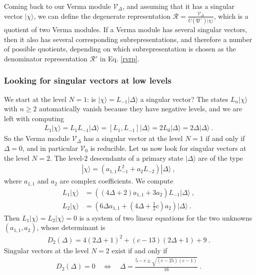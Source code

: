 \documentclass[12pt, a4paper, notitlepage, twoside]{report}
\numberwithin{equation}{section}
\theoremstyle{break}
\begin{document}
Coming back to our Verma module $\mathcal{V}_\Delta$, and assuming that it has a singular vector $|\chi\rangle$, we can define the degenerate representation $\mathcal{R} = \frac{\mathcal{V}_\Delta}{U(\mathfrak{V}^+)|\chi\rangle}$, which is a quotient of two Verma modules.
If a Verma module has several singular vectors, then it also has several corresponding subrepresentations, and therefore a number of possible quotients, depending on which subrepresentation is chosen as the denominator representation $\mathcal{R}'$ in Eq. \eqref{rvrp}.

\subsubsection{Looking for singular vectors at low levels}

We start at the level $N=1$: is $|\chi\rangle=L_{-1}|\Delta\rangle$ a singular vector? The states $L_n|\chi\rangle$ with $n\geq 2$ automatically vanish because they have negative levels, and we are left with computing
\begin{align}
 L_1|\chi\rangle = L_1 L_{-1}|\Delta\rangle = [L_1,L_{-1}]|\Delta\rangle = 2L_0 |\Delta\rangle = 2\Delta|\Delta\rangle\ .
\end{align}
So the Verma module $\mathcal{V}_\Delta$ has a singular vector at the level $N=1$ if and only if $\Delta = 0$, and in particular $\mathcal{V}_0$ is reducible.
Let us now look for singular vectors at the level $N=2$.
The level-$2$ descendants of a primary state $|\Delta\rangle$ are of the type
\begin{align}
 |\chi\rangle = \left(a_{1,1} L_{-1}^2 + a_2 L_{-2}\right) |\Delta\rangle\ ,
\end{align}
where $a_{1,1}$ and $a_2$ are complex coefficients.
We compute 
\begin{align}
 L_1|\chi\rangle &= \left((4\Delta+2)a_{1,1} + 3a_2\right) L_{-1}|\Delta\rangle\ ,
\\
L_2 |\chi \rangle &= \left(6\Delta a_{1,1}+(4\Delta+\tfrac12 c) a_2\right)|\Delta\rangle\ .
\end{align}
Then $L_1|\chi\rangle=L_2 |\chi \rangle=0$ is a system of two linear equations for the two unknowns $(a_{1,1},a_2)$, whose determinant is 
\begin{align}
 D_2(\Delta) = 4(2\Delta+1)^2 +(c-13)(2\Delta+1) +9\ . 
\label{dud}
\end{align}
Singular vectors at the level $N=2$ exist if and only if
\begin{align}
D_2(\Delta)=0 \quad \iff \quad \Delta = \frac{5-c\pm \sqrt{(c-25)(c-1)}}{16}\ .
\label{dcscc}
\end{align}
\end{document}
